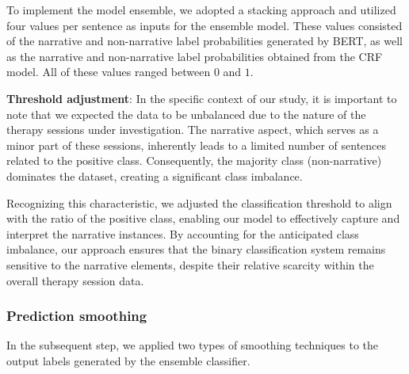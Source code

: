 \documentclass[preprint,12pt]{elsarticle}
\begin{document}
To implement the model ensemble, we adopted a stacking approach and utilized four values per sentence as inputs for the ensemble model. These values consisted of the narrative and non-narrative label probabilities generated by BERT, as well as the narrative and non-narrative label probabilities obtained from the CRF model. All of these values ranged between $0$ and $1$.

\textbf{Threshold adjustment}: In the specific context of our study, it is important to note that we expected the data to be unbalanced due to the nature of the therapy sessions under investigation. The narrative aspect, which serves as a minor part of these sessions, inherently leads to a limited number of sentences related to the positive class. Consequently, the majority class (non-narrative) dominates the dataset, creating a significant class imbalance. 

Recognizing this characteristic, we adjusted the classification threshold to align with the ratio of the positive class, enabling our model to effectively capture and interpret the narrative instances. By accounting for the anticipated class imbalance, our approach ensures that the binary classification system remains sensitive to the narrative elements, despite their relative scarcity within the overall therapy session data.

\subsubsection{Prediction smoothing}

In the subsequent step, we applied two types of smoothing techniques to the output labels generated by the ensemble classifier.
\end{document}
